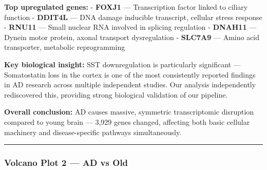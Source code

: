 \documentclass[
]{article}
\newenvironment{Shaded}{\begin{snugshade}}{\end{snugshade}}
\newcommand{\AttributeTok}[1]{\textcolor[rgb]{0.13,0.29,0.53}{#1}}
\newcommand{\ConstantTok}[1]{\textcolor[rgb]{0.56,0.35,0.01}{#1}}
\newcommand{\DecValTok}[1]{\textcolor[rgb]{0.00,0.00,0.81}{#1}}
\newcommand{\FloatTok}[1]{\textcolor[rgb]{0.00,0.00,0.81}{#1}}
\newcommand{\FunctionTok}[1]{\textcolor[rgb]{0.13,0.29,0.53}{\textbf{#1}}}
\newcommand{\NormalTok}[1]{#1}
\newcommand{\OtherTok}[1]{\textcolor[rgb]{0.56,0.35,0.01}{#1}}
\newcommand{\SpecialCharTok}[1]{\textcolor[rgb]{0.81,0.36,0.00}{\textbf{#1}}}
\newcommand{\StringTok}[1]{\textcolor[rgb]{0.31,0.60,0.02}{#1}}
\begin{document}
\textbf{Top upregulated genes:} - \textbf{FOXJ1} --- Transcription
factor linked to ciliary function - \textbf{DDIT4L} --- DNA damage
inducible transcript, cellular stress response - \textbf{RNU11} ---
Small nuclear RNA involved in splicing regulation - \textbf{DNAH11} ---
Dynein motor protein, axonal transport dysregulation - \textbf{SLC7A9}
--- Amino acid transporter, metabolic reprogramming

\textbf{Key biological insight:} SST downregulation is particularly
significant --- Somatostatin loss in the cortex is one of the most
consistently reported findings in AD research across multiple
independent studies. Our analysis independently rediscovered this,
providing strong biological validation of our pipeline.

\textbf{Overall conclusion:} AD causes massive, symmetric transcriptomic
disruption compared to young brain --- 3,929 genes changed, affecting
both basic cellular machinery and disease-specific pathways
simultaneously.

\begin{center}\rule{0.5\linewidth}{0.5pt}\end{center}

\subsubsection{Volcano Plot 2 --- AD vs
Old}\label{volcano-plot-2-ad-vs-old}

\begin{Shaded}
\end{Shaded}
\end{document}
